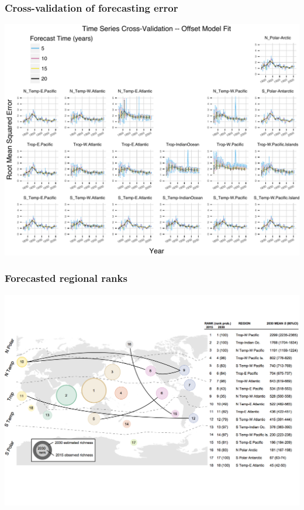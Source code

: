\documentclass{beamer}
\begin{document}
\begin{frame}
  \frametitle{Cross-validation of forecasting error}

  \begin{center}
    \includegraphics[width=\textwidth,height=0.8\textheight,keepaspectratio=true]{figure/edie_cv_forecast}
  \end{center}

\end{frame}

\begin{frame}
  \frametitle{Forecasted regional ranks}

  \begin{center}
    \includegraphics[width=\textwidth,height=0.8\textheight,keepaspectratio=true]{figure/edie_rank}
  \end{center}

\end{frame}
\end{document}

